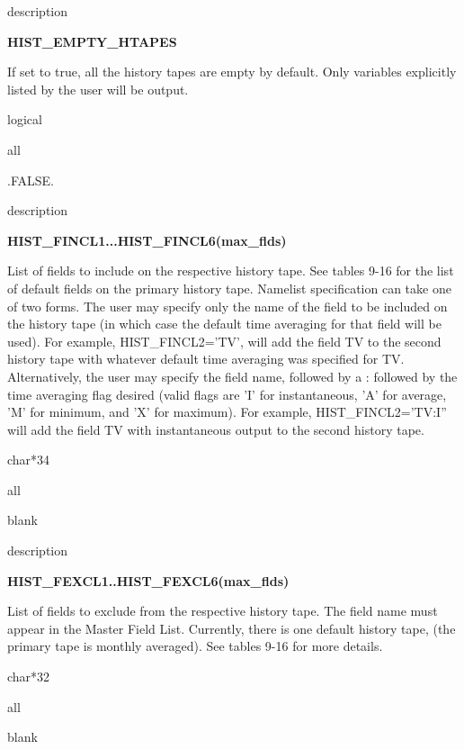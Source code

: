 \begin{Ventry}{description}
 \item[{\bf name}] {\bf HIST\_EMPTY\_HTAPES}   
 \item[description] 
	If set to true, all the history tapes are empty by default.
	Only variables explicitly listed by the user will be output.
 \item[type] logical
 \item[mode] all    
 \item[default] .FALSE.
\end{Ventry}
\medskip

\begin{Ventry}{description}
 \item[{\bf name}] {\bf HIST\_FINCL1...HIST\_FINCL6(max\_flds)}   
 \item[description] 
	List of fields to include on the respective history tape. See
	tables 9-16 for the list of default fields on the primary
	history tape. Namelist specification can take one of two
	forms.  The user may specify only the name of the field to be
	included on the history tape (in which case the default time
	averaging for that field will be used).  For example,
	HIST\_FINCL2='TV', will add the field TV to the second history
	tape with whatever default time averaging was specified for
	TV. Alternatively, the user may specify the field name,
	followed by a : followed by the time averaging flag desired
	(valid flags are 'I' for instantaneous, 'A' for average, 'M'
	for minimum, and 'X' for maximum). For example,
	HIST\_FINCL2='TV:I'' will add the field TV with instantaneous
	output to the second history tape.  
 \item[type] char*34
 \item[mode] all 
 \item[default] blank
\end{Ventry}
\medskip

\begin{Ventry}{description}
 \item[{\bf name}] {\bf HIST\_FEXCL1..HIST\_FEXCL6(max\_flds)}   
\item[description] 
	List of fields to exclude from the respective history
	tape. The field name must appear in the Master Field List.
	Currently, there is one default history tape, (the primary 
	tape is monthly averaged). See tables 9-16 for more details.
 \item[type] char*32
 \item[mode] all    
 \item[default] blank 
\end{Ventry}
\medskip

